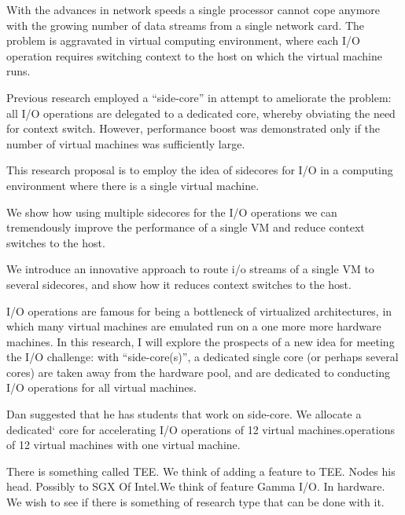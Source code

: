 With the advances in network speeds a single processor cannot cope anymore with
the growing number of data streams from a single network card.  The problem is
aggravated in virtual computing environment, where each I/O operation requires
switching context to the host on which the virtual machine runs.

Previous research employed a ``side-core'' in attempt to ameliorate the problem:
all I/O operations are delegated to a dedicated core, whereby obviating the need 
for context switch. However, performance boost was demonstrated only if the number 
of virtual machines was sufficiently large.

This research proposal is to employ the idea of sidecores for I/O in a computing 
environment where there is a single virtual machine. 

We show how using multiple sidecores for the I/O operations we
can tremendously improve the performance of a single VM and reduce context
switches to the host.

We introduce an innovative approach to route i/o streams
of a single VM to several sidecores, and show how it reduces context switches to the host.




I/O operations are famous for being a bottleneck of virtualized architectures,
  in which many virtual machines are emulated run on a one more more hardware
  machines. In this research, I will explore the prospects of a new idea for
  meeting the I/O challenge: with ``side-core(s)'', a dedicated single core (or
      perhaps several cores) are taken away from the hardware pool, and are
  dedicated to conducting I/O operations for all virtual machines.



Dan suggested that he has students that work on side-core.  We allocate a dedicated` core for accelerating I/O operations of 12 virtual machines.operations of 12 virtual machines with one virtual machine.


There is something called TEE. We think of adding a feature to TEE.  Nodes his
head. Possibly to SGX Of Intel.We think of feature Gamma I/O. In hardware.
We wish to see if there is something of research type that can be done with it.
